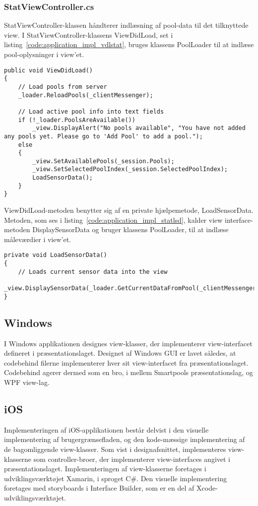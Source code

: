 \subsubsection{StatViewController.cs}
StatViewController-klassen håndterer indlæsning af pool-data til det tilknyttede view. I StatViewController-klassens ViewDidLoad, set i listing~\ref{code:application_impl_vdlstat}, bruges klassens PoolLoader til at indlæse pool-oplysninger i view'et.

\begin{lstlisting}[caption={ViewDidLoad() in StatViewController},label={code:application_impl_vdlstat}]
public void ViewDidLoad()
{
	// Load pools from server
	_loader.ReloadPools(_clientMessenger);

	// Load active pool info into text fields
	if (!_loader.PoolsAreAvailable())
		_view.DisplayAlert("No pools available", "You have not added any pools yet. Please go to 'Add Pool' to add a pool.");
	else
	{
		_view.SetAvailablePools(_session.Pools);
		_view.SetSelectedPoolIndex(_session.SelectedPoolIndex);
		LoadSensorData();
	}
}
\end{lstlisting}

ViewDidLoad-metoden benytter sig af en private hjælpemetode, LoadSensorData. Metoden, som ses i listing~\ref{code:application_impl_statlsd}, kalder view interface-metoden DisplaySensorData og bruger klassens PoolLoader, til at indlæse måleværdier i view'et.

\begin{lstlisting}[caption={LoadSensorData() in StatViewController},label={code:application_impl_statlsd}]
private void LoadSensorData()
{
	// Loads current sensor data into the view
	_view.DisplaySensorData(_loader.GetCurrentDataFromPool(_clientMessenger));
}
\end{lstlisting}

\subsection{Windows}
I Windows applikationen designes view-klasser, der implementerer view-interfacet defineret i præsentationslaget.
Designet af Windows GUI er lavet således, at codebehind filerne implementerer hver sit view-interfacet fra præsentationslaget. Codebehind agerer dermed som en bro, i mellem Smartpools præsentationslag, og WPF view-lag.

\subsection{iOS}
Implementeringen af iOS-applikationen består delvist i den visuelle implementering af brugergrænsefladen, og den kode-mæssige implementering af de bagomliggende view-klasser. Som vist i designafsnittet, implementeres view-klasserne som controller-broer, der implementerer view-interfaces angivet i præsentationslaget. Implementeringen af view-klasserne foretages i udviklingsværktøjet Xamarin, i sproget C\#. Den visuelle implementering foretages med storyboards i Interface Builder, som er en del af Xcode-udviklingsværktøjet.

